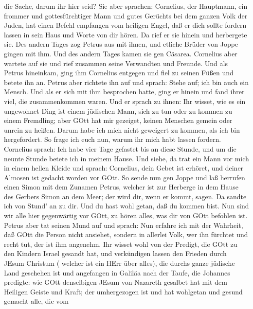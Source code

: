 die Sache, darum ihr hier seid?  Sie aber sprachen:
Cornelius, der Hauptmann, ein frommer und gottesfürchtiger Mann und
gutes Gerüchts bei dem ganzen Volk der Juden, hat einen Befehl empfangen
vom heiligen Engel, daß er dich sollte fordern lassen in sein Haus und
Worte von dir hören.  Da rief er sie hinein und herbergete
sie. Des andern Tages zog Petrus aus mit ihnen, und etliche Brüder von
Joppe gingen mit ihm.  Und des andern Tages kamen sie gen
Cäsarea. Cornelius aber wartete auf sie und rief zusammen seine
Verwandten und Freunde.  Und als Petrus hineinkam, ging ihm
Cornelius entgegen und fiel zu seinen Füßen und betete ihn an.
 Petrus aber richtete ihn auf und sprach: Stehe auf; ich
bin auch ein Mensch.  Und als er sich mit ihm besprochen
hatte, ging er hinein und fand ihrer viel, die zusammenkommen waren.
 Und er sprach zu ihnen: Ihr wisset, wie es ein ungewohnet
Ding ist einem jüdischen Mann, sich zu tun oder zu kommen zu einem
Fremdling; aber GOtt hat mir gezeiget, keinen Menschen gemein oder
unrein zu heißen.  Darum habe ich mich nicht geweigert zu
kommen, als ich bin hergefordert. So frage ich euch nun, warum ihr mich
habt lassen fordern.  Cornelius sprach: Ich habe vier Tage
gefastet bis an diese Stunde, und um die neunte Stunde betete ich in
meinem Hause. Und siehe, da trat ein Mann vor mich in einem hellen
Kleide  und sprach: Cornelius, dein Gebet ist erhöret, und
deiner Almosen ist gedacht worden vor GOtt.  So sende nun
gen Joppe und laß herrufen einen Simon mit dem Zunamen Petrus, welcher
ist zur Herberge in dem Hause des Gerbers Simon an dem Meer; der wird
dir, wenn er kommt, sagen.  Da sandte ich von Stund' an zu
dir. Und du hast wohl getan, daß du kommen bist. Nun sind wir alle hier
gegenwärtig vor GOtt, zu hören alles, was dir von GOtt befohlen ist.
 Petrus aber tat seinen Mund auf und sprach: Nun erfahre
ich mit der Wahrheit, daß GOtt die Person nicht ansiehet, 
sondern in allerlei Volk, wer ihn fürchtet und recht tut, der ist ihm
angenehm.  Ihr wisset wohl von der Predigt, die GOtt zu den
Kindern Israel gesandt hat, und verkündigen lassen den Frieden durch
JEsum Christum ( welcher ist ein HErr über alles),  die
durchs ganze jüdische Land geschehen ist und angefangen in Galiläa nach
der Taufe, die Johannes predigte:  wie GOtt denselbigen
JEsum von Nazareth gesalbet hat mit dem Heiligen Geiste und Kraft; der
umhergezogen ist und hat wohlgetan und gesund gemacht alle, die vom
